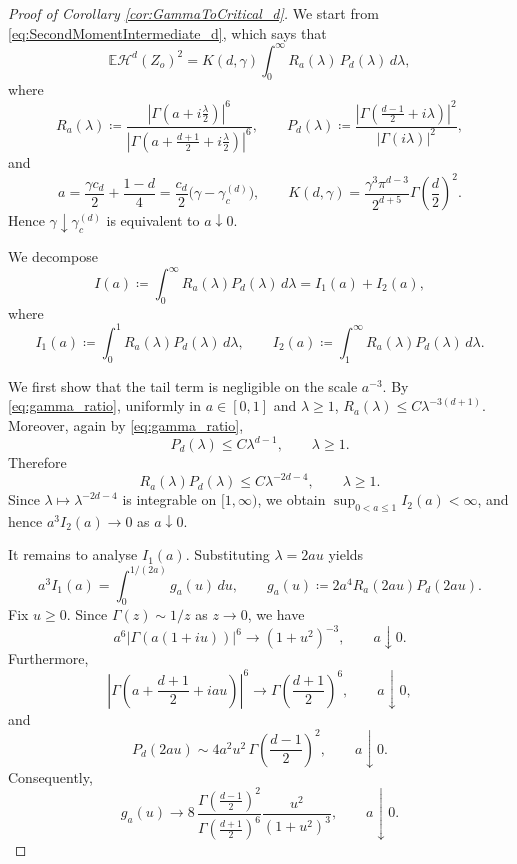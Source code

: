 \documentclass[11pt,a4paper]{article}
\theoremstyle{plain}
\theoremstyle{definition}
\theoremstyle{remark}
\def\EE{\mathbb{E}}
\def\cH{\mathcal{H}}
\begin{document}
\begin{proof}[Proof of Corollary \ref{cor:GammaToCritical_d}]
	 We start from \eqref{eq:SecondMomentIntermediate_d}, which says that
	\[
	\EE\cH^d(Z_o)^2
	=
	K(d,\gamma)\int_0^\infty R_a(\lambda)\,P_d(\lambda)\,d\lambda,
	\]
	where
	\[
	R_a(\lambda)\coloneqq
	\frac{\left| \Gamma\left(a + i\frac{\lambda}{2}\right) \right|^6}{
		\left| \Gamma\left(a + \frac{d+1}{2} + i\frac{\lambda}{2}\right) \right|^6},
	\qquad
	P_d(\lambda)\coloneqq
	\frac{\left| \Gamma\left(\frac{d-1}{2} + i\lambda\right) \right|^2}{
		\left| \Gamma(i\lambda) \right|^2},
	\]
	and
	\[
	a=\frac{\gamma c_d}{2}+\frac{1-d}{4}
	=\frac{c_d}{2}\bigl(\gamma-\gamma_c^{(d)}\bigr),
	\qquad
	K(d,\gamma)=\frac{\gamma^3\pi^{d-3}}{2^{d+5}}\Gamma\!\left(\frac d2\right)^2.
	\]
	Hence \(\gamma\downarrow \gamma_c^{(d)}\) is equivalent to \(a\downarrow 0\).

	We decompose
	\[
	I(a)\coloneqq\int_0^\infty R_a(\lambda)P_d(\lambda)\,d\lambda
	= I_1(a)+I_2(a),
	\]
	where
	\[
	I_1(a)\coloneqq\int_0^1 R_a(\lambda)P_d(\lambda)\,d\lambda,
	\qquad
	I_2(a)\coloneqq\int_1^\infty R_a(\lambda)P_d(\lambda)\,d\lambda.
	\]

	We first show that the tail term is negligible on the scale \(a^{-3}\).
	By \eqref{eq:gamma_ratio}, uniformly in \(a\in[0,1]\) and \(\lambda\ge1\),
	$
	R_a(\lambda)
	\le C \lambda^{-3(d+1)}
	$.	Moreover, again by \eqref{eq:gamma_ratio},
	\[
	P_d(\lambda)\le C\lambda^{d-1},\qquad \lambda\ge1.
	\]
	Therefore
	\[
	R_a(\lambda)P_d(\lambda)\le C\lambda^{-2d-4},\qquad \lambda\ge1.
	\]
	Since \(\lambda\mapsto \lambda^{-2d-4}\) is integrable on \([1,\infty)\), we obtain
	$\sup_{0<a\le1} I_2(a)<\infty$,
	and hence $a^3 I_2(a)\longrightarrow 0$ as $a\downarrow0$.

	It remains to analyse \(I_1(a)\). Substituting \(\lambda=2au\) yields
	\[
	a^3 I_1(a)=\int_0^{1/(2a)} g_a(u)\,du,
	\qquad
	g_a(u)\coloneqq 2a^4R_a(2au)P_d(2au).
	\]
	Fix \(u\ge0\). Since \(\Gamma(z)\sim 1/z\) as \(z\to0\), we have
	\[
	a^6\bigl|\Gamma(a(1+iu))\bigr|^6\longrightarrow (1+u^2)^{-3}, \qquad a\downarrow 0.
	\]
	Furthermore,
	\[
	\left|\Gamma\!\left(a+\frac{d+1}{2}+iau\right)\right|^6
	\longrightarrow
	\Gamma\!\left(\frac{d+1}{2}\right)^6, \qquad a\downarrow 0,
	\]
	and
	\[
	P_d(2au)\sim 4a^2u^2\,\Gamma\!\left(\frac{d-1}{2}\right)^2,\qquad a\downarrow 0.
	\]
	Consequently,
	\[
	g_a(u)\longrightarrow
	8\,\frac{\Gamma\!\left(\frac{d-1}{2}\right)^2}{
		\Gamma\!\left(\frac{d+1}{2}\right)^6}
	\frac{u^2}{(1+u^2)^3},\qquad a\downarrow 0.
	\]


\end{proof}
\end{document}
